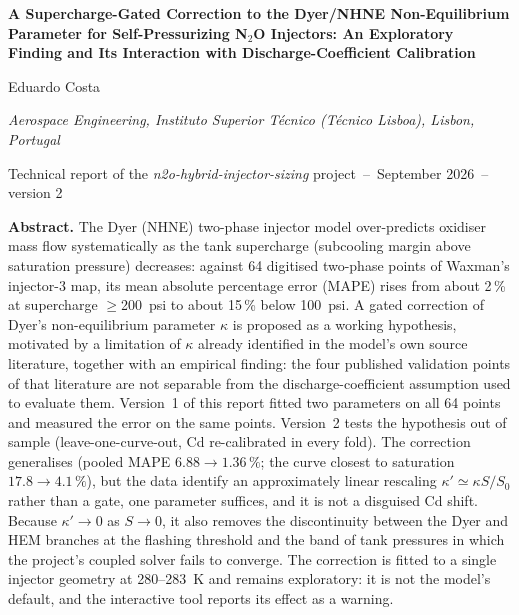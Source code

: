 \documentclass[11pt,a4paper]{article}
\begin{document}
\begin{center}
{\Large\bfseries A Supercharge-Gated Correction to the Dyer/NHNE Non-Equilibrium Parameter for Self-Pressurizing N$_2$O Injectors: An Exploratory Finding and Its Interaction with Discharge-Coefficient Calibration\par}
\vspace{9pt}
{\large Eduardo Costa\par}
\vspace{2pt}
{\small\itshape Aerospace Engineering, Instituto Superior T\'ecnico (T\'ecnico Lisboa), Lisbon, Portugal\par}
{\small Technical report of the \textit{n2o-hybrid-injector-sizing} project \,--\, September 2026 \,--\, version 2\par}
\end{center}
\vspace{8pt}
\begin{center}
\begin{minipage}{.92\textwidth}\small\noindent
\textbf{Abstract.} The Dyer (NHNE) two-phase injector model over-predicts oxidiser mass flow systematically as the tank supercharge (subcooling margin above saturation pressure) decreases: against 64 digitised two-phase points of Waxman's injector-3 map, its mean absolute percentage error (MAPE) rises from about 2\,\% at supercharge $\geq$200~psi to about 15\,\% below 100~psi. A gated correction of Dyer's non-equilibrium parameter $\kappa$ is proposed as a working hypothesis, motivated by a limitation of $\kappa$ already identified in the model's own source literature, together with an empirical finding: the four published validation points of that literature are not separable from the discharge-coefficient assumption used to evaluate them. Version~1 of this report fitted two parameters on all 64 points and measured the error on the same points. Version~2 tests the hypothesis out of sample (leave-one-curve-out, Cd re-calibrated in every fold). The correction generalises (pooled MAPE $6.88\to1.36\,\%$; the curve closest to saturation $17.8\to4.1\,\%$), but the data identify an approximately linear rescaling $\kappa'\simeq\kappa S/S_0$ rather than a gate, one parameter suffices, and it is not a disguised Cd shift. Because $\kappa'\to0$ as $S\to0$, it also removes the discontinuity between the Dyer and HEM branches at the flashing threshold and the band of tank pressures in which the project's coupled solver fails to converge. The correction is fitted to a single injector geometry at 280--283~K and remains exploratory: it is not the model's default, and the interactive tool reports its effect as a warning.
\end{minipage}
\end{center}
\vspace{6pt}
\end{document}

